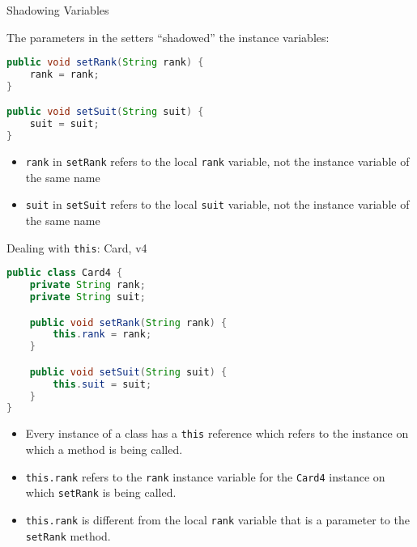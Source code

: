 \documentclass{beamer}
\begin{document}
\begin{frame}[fragile]{Shadowing Variables}


The parameters in the setters ``shadowed'' the instance variables:
\begin{lstlisting}[language=Java]
public void setRank(String rank) {
    rank = rank;
}

public void setSuit(String suit) {
    suit = suit;
}
\end{lstlisting}

\begin{itemize}
\item {\tt rank} in {\tt setRank} refers to the local {\tt rank} variable, not the instance variable of the same name
\item {\tt suit} in {\tt setSuit} refers to the local {\tt suit} variable, not the instance variable of the same name
\end{itemize}


\end{frame}

\begin{frame}[fragile]{Dealing with {\tt this}: Card, v4}

\begin{lstlisting}[language=Java]
public class Card4 {
    private String rank;
    private String suit;

    public void setRank(String rank) {
        this.rank = rank;
    }

    public void setSuit(String suit) {
        this.suit = suit;
    }
}
\end{lstlisting}
\vspace{-.1in}
\begin{itemize}
\item Every instance of a class has a {\tt this} reference which refers to the instance on which a method is being called.
\item {\tt this.rank} refers to the {\tt rank} instance variable for the {\tt Card4} instance on which {\tt setRank} is being called.
\item {\tt this.rank} is different from the local {\tt rank} variable that is a parameter to the {\tt setRank} method.
\end{itemize}

\end{frame}
\end{document}
